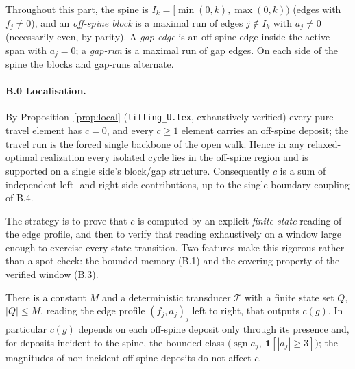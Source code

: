 Throughout this part, the spine is $I_k=[\min(0,k),\max(0,k))$ (edges with $f_j\ne0$), and an
\emph{off-spine block} is a maximal run of edges $j\notin I_k$ with $a_j\ne0$ (necessarily even, by
parity). A \emph{gap edge} is an off-spine edge inside the active span with $a_j=0$; a \emph{gap-run}
is a maximal run of gap edges. On each side of the spine the blocks and gap-runs alternate.

\paragraph{B.0 Localisation.} By Proposition~\ref{prop:local} (\texttt{lifting\_U.tex}, exhaustively
verified) every pure-travel element has $c=0$, and every $c\ge1$ element carries an off-spine deposit;
the travel run is the forced single backbone of the open walk. Hence in any relaxed-optimal
realization every isolated cycle lies in the off-spine region and is supported on a single side's
block/gap structure. Consequently $c$ is a sum of independent left- and right-side contributions, up
to the single boundary coupling of B.4.

The strategy is to prove that $c$ is computed by an explicit \emph{finite-state} reading of the edge
profile, and then to verify that reading exhaustively on a window large enough to exercise every state
transition. Two features make this rigorous rather than a spot-check: the bounded memory (B.1) and the
covering property of the verified window (B.3).

\begin{lemma}\label{lem:fsm}
There is a constant $M$ and a deterministic transducer $\mathcal T$ with a finite state set $Q$,
$|Q|\le M$, reading the edge profile $(f_j,a_j)_j$ left to right, that outputs $c(g)$. In particular
$c(g)$ depends on each off-spine deposit only through its presence and, for deposits incident to the
spine, the bounded class $\bigl(\operatorname{sgn}a_j,\ \mathbf 1[|a_j|\ge3]\bigr)$; the magnitudes of
non-incident off-spine deposits do not affect $c$.
\end{lemma}

